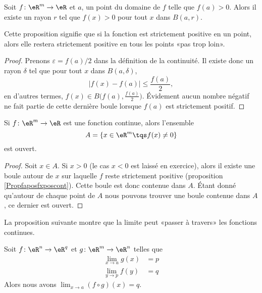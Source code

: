 \begin{proposition}		\label{Propfaposfxposcont}
	Soit $f\colon \eR^m\to \eR$ et $a$, un point du domaine de $f$ telle que $f(a)>0$. Alors il existe un rayon $r$ tel que $f(x)>0$ pour tout $x$ dans $B(a,r)$.
\end{proposition}
Cette proposition signifie que si la fonction est strictement positive en un point, alors elle restera strictement positive en tous les points «pas trop loin».

\begin{proof}
	Prenons $\varepsilon=f(a)/2$ dans la définition de la continuité. Il existe donc un rayon $\delta$ tel que pour tout $x$ dans $B(a,\delta)$,
	\begin{equation}
		| f(x)-f(a) |\leq \frac{ f(a) }{2},
	\end{equation}
	en d'autres termes, $f(x)\in B\big( f(a),\frac{ f(a) }{ 2 } \big)$. Évidement aucun nombre négatif ne fait partie de cette dernière boule lorsque $f(a)$ est strictement positif.
\end{proof}

\begin{corollary}		\label{CorfneqzOuvert}
	Si $f\colon \eR^m\to \eR$ est une fonction continue, alors l'ensemble
	\begin{equation}
		A=\{ x\in\eR^m\tqs f(x)\neq 0 \}
	\end{equation}
	est ouvert.
\end{corollary}

\begin{proof}
	Soit $x\in A$. Si $x>0$ (le cas $x<0$ est laissé en exercice), alors il existe une boule autour de $x$ sur laquelle $f$ reste strictement positive (proposition \ref{Propfaposfxposcont}). Cette boule est donc contenue dans $A$. Étant donné qu'autour de chaque point de $A$ nous pouvons trouver une boule contenue dans $A$, ce dernier est ouvert.
\end{proof}

La proposition suivante montre que la limite peut «passer à travers» les fonctions continues.
\begin{proposition}		\label{PropLimCompose}
	Soit $f\colon \eR^n\to \eR^q$ et $g\colon \eR^m\to \eR^n$ telles que
	\begin{subequations}
		\begin{align}
			\lim_{x\to a} g(x)&= p		\label{EqLimCompHypa}\\
			\lim_{y\to p} f(y)&= q		\label{EqLimCompHypb}
		\end{align}
	\end{subequations}
	Alors nous avons $\lim_{x\to a} (f\circ g)(x)=q$. 
\end{proposition}

